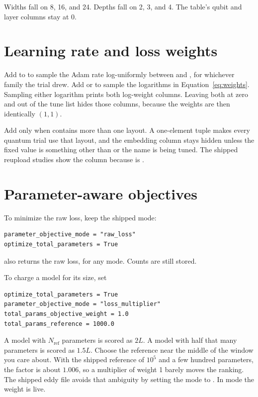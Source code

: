 Widths fall on 8, 16, and 24.
Depths fall on 2, 3, and 4.
The table's qubit and layer columns stay at 0.

\section{Learning rate and loss weights}

Add  to  to sample the Adam rate log-uniformly between  and , for whichever family the trial drew.
Add  or  to sample the logarithms in Equation~\eqref{eq:weights}.
Sampling either logarithm prints both log-weight columns.
Leaving both at zero and out of the tune list hides those columns, because the weights are then identically \((1,1)\).

Add  only when  contains more than one layout.
A one-element tuple makes every quantum trial use that layout, and the embedding column stays hidden unless the fixed value is something other than  or the name is being tuned.
The shipped reupload studies show the column because  is .

\section{Parameter-aware objectives}

To minimize the raw loss, keep the shipped mode:

\begin{lstlisting}
parameter_objective_mode = "raw_loss"
optimize_total_parameters = True
\end{lstlisting}

 also returns the raw loss, for any mode.
Counts are still stored.

To charge a model for its size, set

\begin{lstlisting}
optimize_total_parameters = True
parameter_objective_mode = "loss_multiplier"
total_params_objective_weight = 1.0
total_params_reference = 1000.0
\end{lstlisting}

A model with \(N_{\mathrm{ref}}\) parameters is scored as \(2L\).
A model with half that many parameters is scored as \(1.5L\).
Choose the reference near the middle of the window you care about.
With the shipped reference of \(10^{5}\) and a few hundred parameters, the factor is about \(1.006\), so a multiplier of weight 1 barely moves the ranking.
The shipped eddy file avoids that ambiguity by setting the mode to .
In  mode the weight is live.

